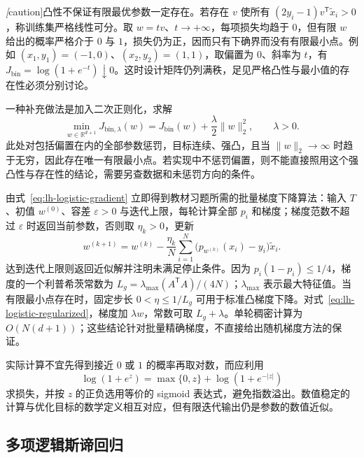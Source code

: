 \emph[caution]{凸性不保证有限最优参数一定存在。}若存在 $v$ 使所有 $(2y_i-1)v^{\mathsf T}\widetilde x_i>0$，称训练集严格线性可分。取 $w=tv$、$t\to+\infty$，每项损失均趋于 $0$，但有限 $w$ 给出的概率严格介于 $0$ 与 $1$，损失仍为正，因而只有下确界而没有有限最小点。例如 $(x_1,y_1)=(-1,0)$、$(x_2,y_2)=(1,1)$，取偏置为 $0$、斜率为 $t$，有 $J_{\mathrm{bin}}=\log(1+e^{-t})\downarrow0$。这时设计矩阵仍列满秩，足见严格凸性与最小值的存在性必须分别讨论。

一种补充做法是加入二次正则化，求解
\begin{equation}
\min_{w\in\mathbb R^{d+1}}
J_{\mathrm{bin},\lambda}(w)=J_{\mathrm{bin}}(w)+\frac\lambda2\|w\|_2^2,
\qquad\lambda>0.
\label{eq:lh-logistic-regularized}
\end{equation}
此处对包括偏置在内的全部参数惩罚，目标连续、强凸，且当 $\|w\|_2\to\infty$ 时趋于无穷，因此存在唯一有限最小点。若实现中不惩罚偏置，则不能直接照用这个强凸性与存在性的结论，需要另查数据和未惩罚方向的条件。

由式~\eqref{eq:lh-logistic-gradient} 立即得到教材习题所需的批量梯度下降算法：输入 $T$、初值 $w^{(0)}$、容差 $\varepsilon>0$ 与迭代上限，每轮计算全部 $p_i$ 和梯度；梯度范数不超过 $\varepsilon$ 时返回当前参数，否则取 $\eta_k>0$，更新
\begin{equation}
w^{(k+1)}=w^{(k)}-\frac{\eta_k}{N}
\sum_{i=1}^N\bigl(p_{w^{(k)}}(x_i)-y_i\bigr)\widetilde x_i.
\label{eq:lh-logistic-gd}
\end{equation}
达到迭代上限则返回近似解并注明未满足停止条件。因为 $p_i(1-p_i)\leq1/4$，梯度的一个利普希茨常数为 $L_g=\lambda_{\max}(A^{\mathsf T}A)/(4N)$；$\lambda_{\max}$ 表示最大特征值。当有限最小点存在时，固定步长 $0<\eta\leq1/L_g$ 可用于标准凸梯度下降。对式~\eqref{eq:lh-logistic-regularized}，梯度加 $\lambda w$，常数可取 $L_g+\lambda$。单轮稠密计算为 $O(N(d+1))$；这些结论针对批量精确梯度，不直接给出随机梯度方法的保证。

实际计算不宜先得到接近 $0$ 或 $1$ 的概率再取对数，而应利用
\[
\log(1+e^z)=\max\{0,z\}+\log(1+e^{-|z|})
\]
求损失，并按 $z$ 的正负选用等价的 sigmoid 表达式，避免指数溢出。数值稳定的计算与优化目标的数学定义相互对应，但有限迭代输出仍是参数的数值近似。

\subsection{多项逻辑斯谛回归}
\label{subsec:lh-multinomial-logistic}

